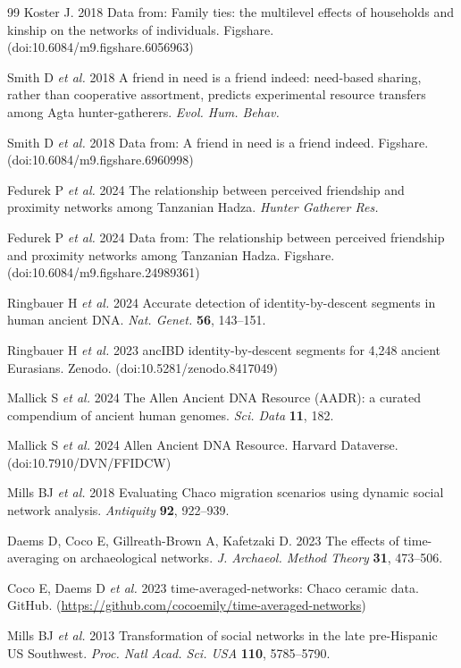 \documentclass[11pt]{article}
\begin{document}
\begin{thebibliography}{99}
Koster J. 2018 Data from: Family ties: the multilevel effects of households and kinship on the networks
of individuals. Figshare. (doi:10.6084/m9.figshare.6056963)

Smith D \textit{et al.} 2018 A friend in need is a friend indeed: need-based sharing, rather than
cooperative assortment, predicts experimental resource transfers among Agta hunter-gatherers.
\textit{Evol. Hum. Behav.}

Smith D \textit{et al.} 2018 Data from: A friend in need is a friend indeed. Figshare.
(doi:10.6084/m9.figshare.6960998)

Fedurek P \textit{et al.} 2024 The relationship between perceived friendship and proximity networks
among Tanzanian Hadza. \textit{Hunter Gatherer Res.}

Fedurek P \textit{et al.} 2024 Data from: The relationship between perceived friendship and proximity
networks among Tanzanian Hadza. Figshare. (doi:10.6084/m9.figshare.24989361)

Ringbauer H \textit{et al.} 2024 Accurate detection of identity-by-descent segments in human ancient DNA.
\textit{Nat. Genet.} \textbf{56}, 143--151.

Ringbauer H \textit{et al.} 2023 ancIBD identity-by-descent segments for 4,248 ancient Eurasians.
Zenodo. (doi:10.5281/zenodo.8417049)

Mallick S \textit{et al.} 2024 The Allen Ancient DNA Resource (AADR): a curated compendium of ancient
human genomes. \textit{Sci. Data} \textbf{11}, 182.

Mallick S \textit{et al.} 2024 Allen Ancient DNA Resource. Harvard Dataverse.
(doi:10.7910/DVN/FFIDCW)

Mills BJ \textit{et al.} 2018 Evaluating Chaco migration scenarios using dynamic social network
analysis. \textit{Antiquity} \textbf{92}, 922--939.

Daems D, Coco E, Gillreath-Brown A, Kafetzaki D. 2023 The effects of time-averaging on archaeological
networks. \textit{J. Archaeol. Method Theory} \textbf{31}, 473--506.

Coco E, Daems D \textit{et al.} 2023 time-averaged-networks: Chaco ceramic data. GitHub.
(\url{https://github.com/cocoemily/time-averaged-networks})

Mills BJ \textit{et al.} 2013 Transformation of social networks in the late pre-Hispanic US Southwest.
\textit{Proc. Natl Acad. Sci. USA} \textbf{110}, 5785--5790.


\end{thebibliography}
\end{document}
